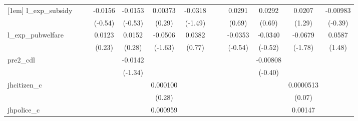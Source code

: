 {\begin{tabular}{l*{12}{c}}
[1em]
l\_exp\_subsidy&                     &                     &     -0.0156         &     -0.0153         &     0.00373         &     -0.0318         &                     &                     &      0.0291         &      0.0292         &      0.0207         &    -0.00983         \\
            &                     &                     &     (-0.54)         &     (-0.53)         &      (0.29)         &     (-1.49)         &                     &                     &      (0.69)         &      (0.69)         &      (1.29)         &     (-0.39)         \\
[1em]
l\_exp\_pubwelfare&                     &                     &      0.0123         &      0.0152         &     -0.0506         &      0.0382         &                     &                     &     -0.0353         &     -0.0340         &     -0.0679         &      0.0587         \\
            &                     &                     &      (0.23)         &      (0.28)         &     (-1.63)         &      (0.77)         &                     &                     &     (-0.54)         &     (-0.52)         &     (-1.78)         &      (1.48)         \\
[1em]
pre2\_cdl    &                     &                     &                     &     -0.0142         &                     &                     &                     &                     &                     &    -0.00808         &                     &                     \\
            &                     &                     &                     &     (-1.34)         &                     &                     &                     &                     &                     &     (-0.40)         &                     &                     \\
[1em]
jhcitizen\_c &                     &                     &                     &                     &    0.000100         &                     &                     &                     &                     &                     &   0.0000513         &                     \\
            &                     &                     &                     &                     &      (0.28)         &                     &                     &                     &                     &                     &      (0.07)         &                     \\
[1em]
jhpolice\_c  &                     &                     &                     &                     &    0.000959\sym{*}  &                     &                     &                     &                     &                     &     0.00147         &                     \\

\end{tabular}}
